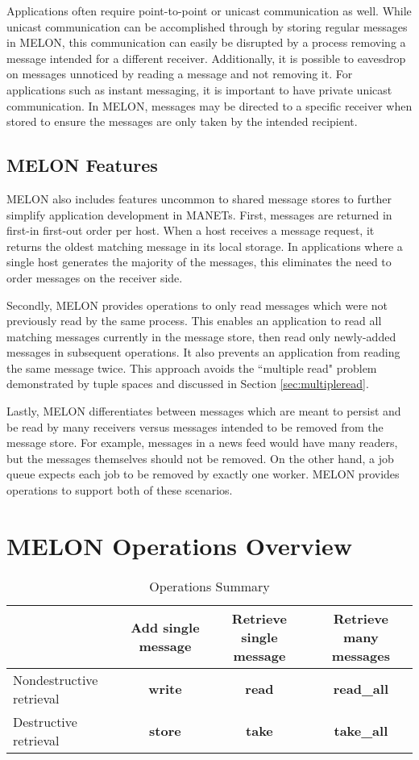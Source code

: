 Applications often require point-to-point or unicast communication as well. While unicast communication can be accomplished through by storing regular messages in MELON, this communication can easily be disrupted by a process removing a message intended for a different receiver. Additionally, it is possible to eavesdrop on messages unnoticed by reading a message and not removing it. For applications such as instant messaging, it is important to have private unicast communication. In MELON, messages may be directed to a specific receiver when stored to ensure the messages are only taken by the intended recipient.

\subsection{MELON Features}

MELON also includes features uncommon to shared message stores to further simplify application development in MANETs. First, messages are returned in first-in first-out order per host. When a host receives a message request, it returns the oldest matching message in its local storage. In applications where a single host generates the majority of the messages, this eliminates the need to order messages on the receiver side.

Secondly, MELON provides operations to only read messages which were not previously read by the same process. This enables an application to read all matching messages currently in the message store, then read only newly-added messages in subsequent operations. It also prevents an application from reading the same message twice. This approach avoids the ``multiple read" problem demonstrated by tuple spaces and discussed in Section \ref{sec:multipleread}.

Lastly, MELON differentiates between messages which are meant to persist and be read by many receivers versus messages intended to be removed from the message store. For example, messages in a news feed would have many readers, but the messages themselves should not be removed. On the other hand, a job queue expects each job to be removed by exactly one worker. MELON provides operations to support both of these scenarios.

\section{MELON Operations Overview}

\begin{table}
\centering
\caption{Operations Summary}
\begin{tabular}{|p{3cm}|c|c|c|} \hline
& Add single message & Retrieve single message & Retrieve many messages \\ \hline
Nondestructive retrieval & \textbf{write} & \textbf{read} & \textbf{read\_all} \\ \hline
Destructive retrieval & \textbf{store} & \textbf{take} & \textbf{take\_all} \\ \hline
\end{tabular}
\label{table:opsummary}
\end{table}

